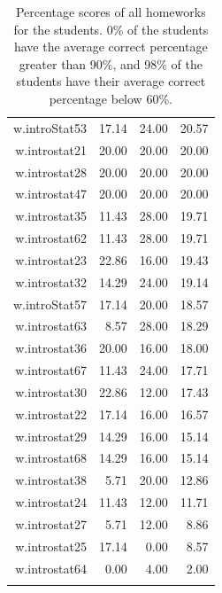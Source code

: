 \documentclass[12pt,nohyper]{tufte-handout}\usepackage[]{graphicx}\usepackage[]{color}
\begin{document}
\begin{longtable}{rrrr}
  w.introStat53 & 17.14 & 24.00 & 20.57 \\ 
  w.introstat21 & 20.00 & 20.00 & 20.00 \\ 
  w.introstat28 & 20.00 & 20.00 & 20.00 \\ 
  w.introstat47 & 20.00 & 20.00 & 20.00 \\ 
  w.introstat35 & 11.43 & 28.00 & 19.71 \\ 
  w.introstat62 & 11.43 & 28.00 & 19.71 \\ 
  w.introstat23 & 22.86 & 16.00 & 19.43 \\ 
  w.introstat32 & 14.29 & 24.00 & 19.14 \\ 
  w.introStat57 & 17.14 & 20.00 & 18.57 \\ 
  w.introstat63 & 8.57 & 28.00 & 18.29 \\ 
  w.introstat36 & 20.00 & 16.00 & 18.00 \\ 
  w.introstat67 & 11.43 & 24.00 & 17.71 \\ 
  w.introstat30 & 22.86 & 12.00 & 17.43 \\ 
  w.introstat22 & 17.14 & 16.00 & 16.57 \\ 
  w.introstat29 & 14.29 & 16.00 & 15.14 \\ 
  w.introstat68 & 14.29 & 16.00 & 15.14 \\ 
  w.introstat38 & 5.71 & 20.00 & 12.86 \\ 
  w.introstat24 & 11.43 & 12.00 & 11.71 \\ 
  w.introstat27 & 5.71 & 12.00 & 8.86 \\ 
  w.introstat25 & 17.14 & 0.00 & 8.57 \\ 
  w.introstat64 & 0.00 & 4.00 & 2.00 \\ 
   \hline
\hline
\caption{Percentage scores of all homeworks for the students. 0\% of the students have the average correct percentage greater than 90\%, and 98\% of the students have their average correct percentage below 60\%.} 
\label{tab:data}
\end{longtable}
\end{document}
